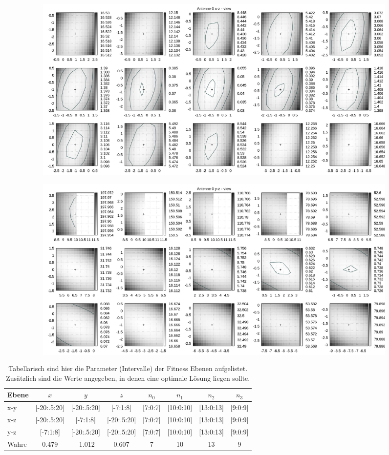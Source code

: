 \begin{figure}[!h]
\begin{subfigure}[t]{0.4\textwidth}
			\centering
			\includegraphics[width=\textwidth]{img/fitness/xz_a0zoomed.png}
	 \end{subfigure}
	 \qquad
     \begin{subfigure}[t]{0.4\textwidth}
			\centering
			\includegraphics[width=\textwidth]{img/fitness/yz_a0zoomed.png}
	 \end{subfigure}      
\end{figure}
%
\begin{table} [h]
	\begin{center}
		\begin{tabular}{lccccccc}
		\textbf{Ebene} & \textbf{$x$} & \textbf{$y$} & \textbf{$z$} & \textbf{$n_0$} & \textbf{$n_1$}& \textbf{$n_2$} & \textbf{$n_3$} \\
			\hline
			x-y & [-20:.5:20]		& [-20:.5:20]	& [-7:1:8] & [7:0:7] & [10:0:10]& [13:0:13]&[9:0:9]   \\
			x-z & [-20:.5:20] 	& [-7:1:8] 	& [-20:.5:20] & [7:0:7] & [10:0:10]& [13:0:13]&[9:0:9] \\
			y-z & [-7:1:8]  	& [-20:.5:20]	& [-20:.5:20] & [7:0:7] & [10:0:10]& [13:0:13]&[9:0:9]\\
			\hline
			Wahre & 0.479 & -1.012 & 0.607 & 7  & 10 & 13 & 9			\\
%
		\end{tabular}
		\caption[Parameter der Fitness Ebenen]{Tabellarisch sind hier die Parameter (Intervalle) der Fitness Ebenen aufgelistet. Zusätzlich sind die Werte angegeben, in denen eine optimale Lösung liegen sollte. }
		\label{tab:complexity1}
	\end{center}
\end{table}